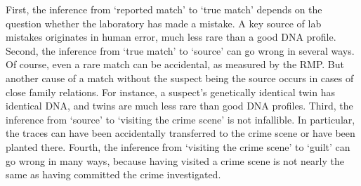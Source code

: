 \documentclass[10pt]{article}
\begin{document}
First, the inference from `reported match' to `true match' depends on the question whether the laboratory has made a mistake. A key source of lab mistakes originates in human error, much less rare than a good DNA profile.
Second, the inference from `true match' to `source' can go wrong in several ways. Of course, even a rare match can be accidental, as measured by the RMP. But another cause of a match without the suspect being the source occurs in cases of close family relations. For instance, a suspect's genetically identical twin has identical DNA, and twins are much less rare than good DNA profiles. 
Third, the inference from `source' to `visiting the crime scene' is not infallible. In particular, the traces can have been accidentally transferred to the crime scene or have been planted there. Fourth, the inference from `visiting the crime scene' to `guilt' can go wrong in many ways, because having visited a crime scene is not nearly the same as having committed the crime investigated.

\end{document}
